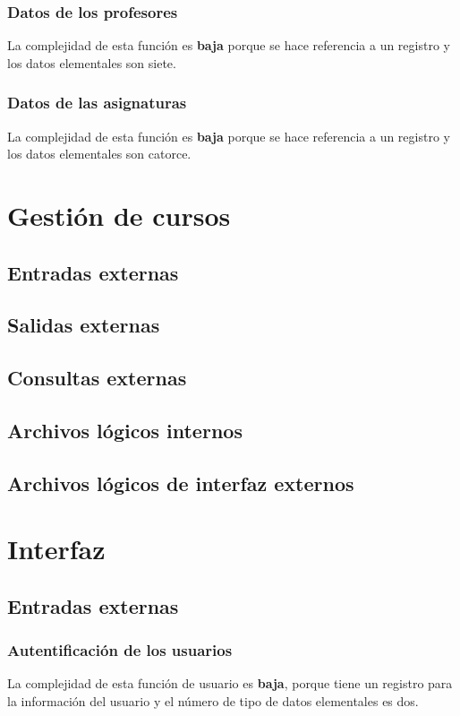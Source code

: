\documentclass[11pt,a4paper,spanish,twoside]{book}
\begin{document}
\subsubsection{Datos de los profesores}
La complejidad de esta función es \textbf{baja} porque se hace referencia a
un registro y los datos elementales son siete.

\subsubsection{Datos de las asignaturas}
La complejidad de esta función es \textbf{baja} porque se hace referencia a
un registro y los datos elementales son catorce.

\section{Gestión de cursos}
\subsection{Entradas externas}
\subsection{Salidas externas}
\subsection{Consultas externas}
\subsection{Archivos lógicos internos}
\subsection{Archivos lógicos de interfaz externos}

\section{Interfaz}
\subsection{Entradas externas}
\subsubsection{Autentificación de los usuarios}
La complejidad de esta función de usuario es \textbf{baja}, porque tiene un
registro para la información del usuario y el número de tipo de datos
elementales es dos. 
\end{document}
